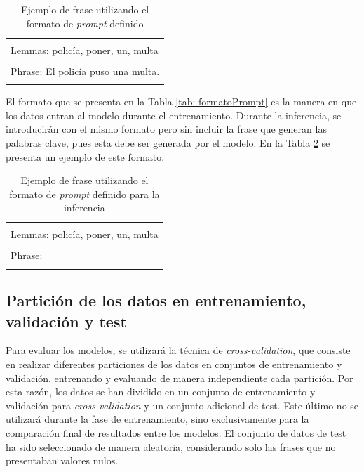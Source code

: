\documentclass[11pt,spanish,listoffigures,listoftables]{tfgetsinf}
\begin{document}
\begin{table}[!h]
\caption{Ejemplo de frase utilizando el formato de \textit{prompt} definido}
\begin{center}
\begin{tabular}{ | l | }
\hline
	\\
	Lemmas: policía, poner, un, multa \\
	\\
	Phrase: El policía puso una multa. \\
	\\
\hline
\end{tabular}
\end{center}
\label{tab: ejemploPrompt}
\end{table}


El formato que se presenta en la Tabla \ref{tab: formatoPrompt} es la manera en que los datos entran al modelo durante el entrenamiento. Durante la inferencia, se introducirán con el mismo formato pero sin incluir la frase que generan las palabras clave, pues esta debe ser generada por el modelo. En la Tabla \ref{tab: formatoInferencia} se presenta un ejemplo de este formato.

\begin{table}[!h]
\caption{Ejemplo de frase utilizando el formato de \textit{prompt} definido para la inferencia}
\begin{center}
\begin{tabular}{ | l | }
\hline
	\\
	Lemmas: policía, poner, un, multa \\
	\\
	Phrase: \\
	\\
\hline
\end{tabular}
\end{center}
\label{tab: formatoInferencia}
\end{table}

\subsection{Partición de los datos en entrenamiento, validación y test}

Para evaluar los modelos, se utilizará la técnica de \textit{cross-validation}, que consiste en realizar diferentes particiones de los datos en conjuntos de entrenamiento y validación, entrenando y evaluando de manera independiente cada partición. Por esta razón, los datos se han dividido en un conjunto de entrenamiento y validación para \textit{cross-validation} y un conjunto adicional de test. Este último no se utilizará durante la fase de entrenamiento, sino exclusivamente para la comparación final de resultados entre los modelos. El conjunto de datos de test ha sido seleccionado de manera aleatoria, considerando solo las frases que no presentaban valores nulos.
\end{document}

